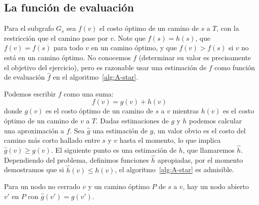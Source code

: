 \subsection{La función de evaluación}
\label{sec:A-star-evaluacion}

  Para el subgrafo \(G_s\) sea \(f(v)\) el costo óptimo
  de un camino de \(s\) a \(T\),
  con la restricción que el camino pase por \(v\).
  Note que \(f(s) = h(s)\),
  que \(f(v) = f(s)\) para todo \(v\) en un camino óptimo,
  y que \(f(v) > f(s)\) si \(v\) no está en un camino óptimo.
  No conocemos \(f\)
  (determinar su valor es precisamente el objetivo del ejercicio),
  pero es razonable usar una estimación de \(f\)
  como función de evaluación \(\widehat{f}\)
  en el algoritmo~\ref{alg:A-star}.

  Podemos escribir \(f\) como una suma:
  \begin{equation}
    \label{eq:A-star:f=g+h}
    f(v)
      = g(v) + h(v)
  \end{equation}
  donde \(g(v)\) es el costo óptimo de un camino de \(s\) a \(v\)
  mientras \(h(v)\) es el costo óptimo de un camino de \(v\) a \(T\).
  Dadas estimaciones de \(g\) y \(h\)
  podemos calcular una aproximación a \(f\).
  Sea \(\widehat{g}\) una estimación de \(g\),
  un valor obvio es el costo del camino más corto hallado entre \(s\) y \(v\)
  hasta el momento,
  lo que implica \(\widehat{g}(v) \ge g(v)\).
  El siguiente punto es una estimación de \(h\),
  que llamaremos \(\widehat{h}\).
  Dependiendo del problema,
  definimos funciones \(\widehat{h}\) apropiadas,
  por el momento demostramos que si \(\widehat{h}(v) \le h(v)\),
  el algoritmo~\ref{alg:A-star} es admisible.
  \begin{lemma}
    \label{lem:A-star:1}
    Para un nodo no cerrado \(v\) y un camino óptimo \(P\) de \(s\) a \(v\),
    hay un nodo abierto \(v'\) en \(P\)
    con \(\widehat{g}(v') = g(v')\).
  \end{lemma}
